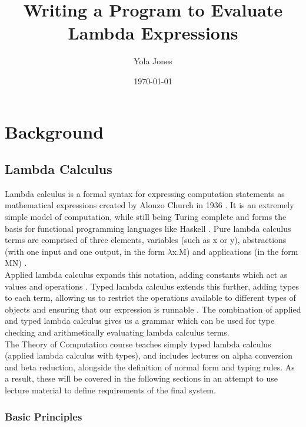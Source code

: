 \documentclass[a4paper,12pt]{report}
\begin{document}
\title{Writing a Program to Evaluate Lambda Expressions}
\author{Yola Jones}
\date{\today}
\maketitle

%
%

\chapter{Background}
\section{Lambda Calculus}

Lambda calculus is a formal syntax for expressing computation statements as mathematical expressions \cite{Selinger2013} created by Alonzo Church in 1936 \cite{Barendregt2000}. It is an extremely simple model of computation, while still being Turing complete \cite{Rojas1998} and forms the basis for functional programming languages like Haskell \cite{Barendregt2000}. Pure lambda calculus terms are comprised of three elements, variables (such as x or y), abstractions (with one input and one output, in the form $\lambda$x.M) and applications (in the form MN) \cite{Hankin2004}.\\

Applied lambda calculus expands this notation, adding constants which act as values and operations \cite{Slonneger1995}. Typed lambda calculus extends this further, adding types to each term, allowing us to restrict the operations available to different types of objects and ensuring that our expression is runnable \cite{Loader1998}. The combination of applied and typed lambda calculus gives us a grammar which can be used for type checking and arithmetically evaluating lambda calculus terms.\\

The Theory of Computation course teaches simply typed lambda calculus (applied lambda calculus with types), and includes lectures on alpha conversion and beta reduction, alongside the definition of normal form and typing rules. As a result, these will be covered in the following sections in an attempt to use lecture material to define requirements of the final system.

\subsection{Basic Principles}
\end{document}
